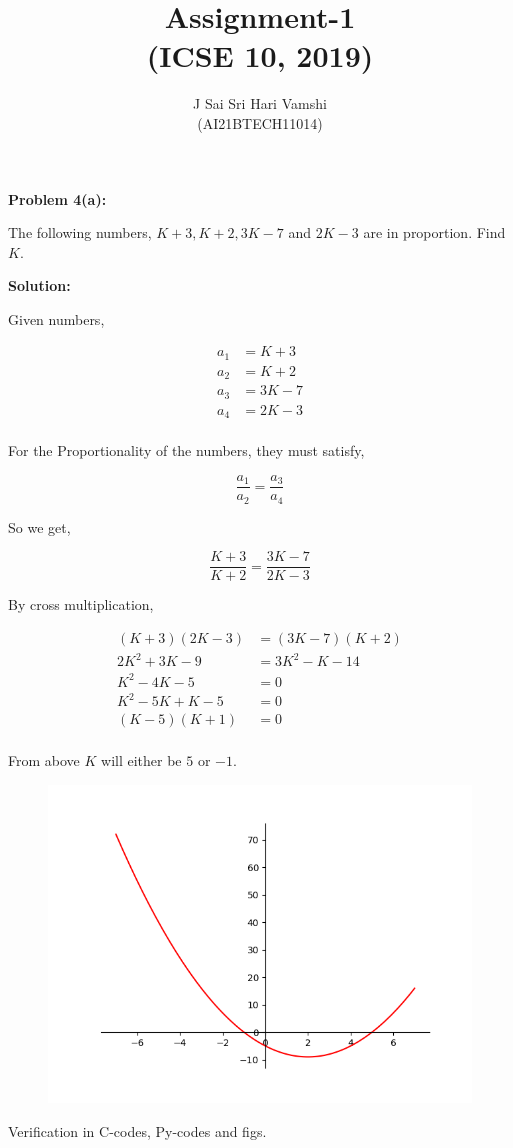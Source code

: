 \documentclass[journal,12pt,twocolumn]{article}\usepackage[margin=1.25in]{geometry}
\title{\LARGE{\textbf{Assignment-1}\\(ICSE 10, 2019)}}
\author{J Sai Sri Hari Vamshi\\ (AI21BTECH11014)}
\date{}
\begin{document}
\maketitle

\begin{center}
    \textbf{\large Problem 4(a):}
\end{center}
\begin{flushleft}
The following numbers, $K + 3, K + 2, 3K - 7$ and $2K - 3$ are in proportion. Find $K$.\\[2\baselineskip]
\end{flushleft}
\begin{center}
    \textbf{\large Solution:}
\end{center}

\noindent Given numbers,

\begin{align*}
a_1 & = K + 3\\
a_2 & = K + 2\\
a_3 & = 3K - 7\\
a_4 & = 2K - 3\\
\end{align*}

\noindent For the Proportionality of the numbers, they must satisfy,

\[ \frac{a_1}{a_2} = \frac{a_3}{a_4} \]

\noindent So we get,

\[ \frac{K + 3}{K + 2} = \frac{3K - 7}{2K - 3} \]

\noindent By cross multiplication,

\begin{align*}
    (K + 3)(2K - 3) & = (3K - 7)(K + 2)\\
    2K^2 + 3K - 9 & = 3K^2 - K - 14\\
    K^2 - 4K - 5 & = 0\\
    K^2 - 5K + K - 5 & = 0\\
    (K - 5)(K + 1) & = 0\\
\end{align*}

\noindent From above $K$ will either be $5$ or $-1$.\\ [\baselineskip]

\begin{figure}[htbp]
\centerline{\includegraphics[scale=0.5]{Figure_1_py.png}}
\caption{}
\label{fig}
\end{figure}
 
Verification in C-codes, Py-codes and figs.
\end{document}
